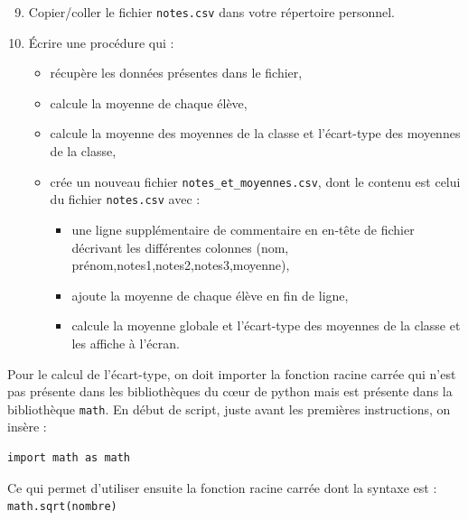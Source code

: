 \begin{enumerate}
\setcounter{enumi}{8}

\item Copier/coller le fichier \verb|notes.csv| dans votre répertoire personnel.

\item Écrire une procédure qui :

\begin{itemize}
 \item récupère les données présentes dans le fichier,
 \item calcule la moyenne de chaque élève,
 \item calcule la moyenne des moyennes de la classe et l'écart-type des moyennes de la classe,
 \item crée un nouveau fichier \verb|notes_et_moyennes.csv|, dont le contenu est celui du fichier \verb|notes.csv| avec :
 \begin{itemize}
  \item une ligne supplémentaire de commentaire en en-tête de fichier décrivant les différentes colonnes (nom, prénom,notes1,notes2,notes3,moyenne),
  \item ajoute la moyenne de chaque élève en fin de ligne,
  \item calcule la moyenne globale et l'écart-type des moyennes de la classe et les affiche à l'écran.
 \end{itemize}

\end{itemize}
\end{enumerate}

Pour le calcul de l'écart-type, on doit importer la fonction racine carrée qui n'est pas présente dans les bibliothèques du cœur de python mais est présente dans la bibliothèque \texttt{math}. En début de script, juste avant les premières instructions, on insère :

\begin{verbatim}
import math as math
\end{verbatim}

Ce qui permet d'utiliser ensuite la fonction racine carrée dont la syntaxe est :\\
\texttt{math.sqrt(nombre)}

